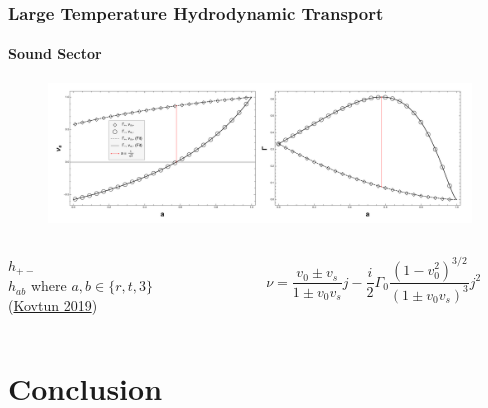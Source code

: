 \documentclass[xcolor=dvipsnames]{beamer}
\begin{document}
\begin{frame}
  \frametitle{Large Temperature Hydrodynamic Transport}
  \framesubtitle{Sound Sector}
  \begin{figure}
    \centering
    \includegraphics[width=0.9\paperwidth]{figs/scalar_rinf_hydro_DiffandPropOverA.pdf}
  \end{figure}

  \begin{columns}[c]
    \begin{column}{0.4\textwidth}
      \(h_{+-}\) \\ \(h_{ab}\) where \(a,b \in \{r,t,3\}\)\\
      (\href{https://inspirehep.net/literature/1744607}{Kovtun 2019})
    \end{column}

    \begin{column}{0.4\textwidth}
      \begin{equation*}
        \nu = \frac{v_0\pm v_s}{1\pm v_0 v_s} j - \frac{i}{2} {\Gamma_0} \frac{(1-v_0^2)^{3/2}}{(1\pm v_0 v_s)^3} j^2
      \end{equation*}
    \end{column}
  \end{columns}

\end{frame}  

\section{Conclusion}
\end{document}

